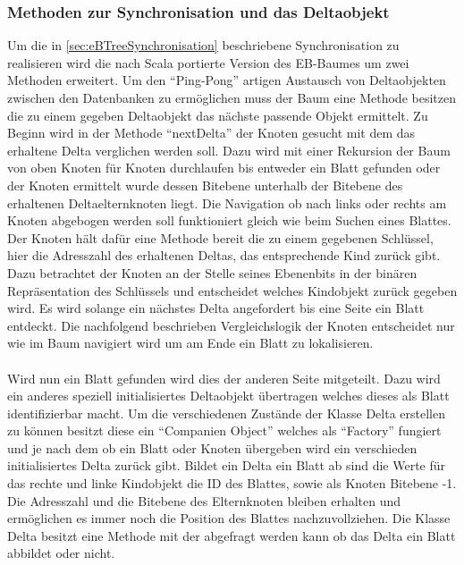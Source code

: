 \documentclass[a4paper,11pt,oneside,%
headsepline,												%
footsepline,												%
bibtotocnumbered									%
]{scrreprt}
\begin{document}
\subsubsection{Methoden zur Synchronisation und das Deltaobjekt}
Um die in \autoref{sec:eBTreeSynchronisation} beschriebene Synchronisation zu realisieren wird die nach Scala portierte Version des \ac{EB-Baum}es um zwei Methoden erweitert. Um den \enquote{Ping-Pong} artigen Austausch von Deltaobjekten zwischen den Datenbanken zu ermöglichen muss der Baum eine Methode besitzen die zu einem gegeben Deltaobjekt das nächste passende Objekt ermittelt. Zu Beginn wird in der Methode \enquote{nextDelta} der Knoten gesucht mit dem das erhaltene Delta verglichen werden soll. Dazu wird mit einer Rekursion der Baum von oben Knoten für Knoten durchlaufen bis entweder ein Blatt gefunden oder der Knoten ermittelt wurde dessen Bitebene unterhalb der Bitebene des erhaltenen Deltaelternknoten liegt. Die Navigation ob nach links oder rechts am Knoten abgebogen werden soll funktioniert gleich wie beim Suchen eines Blattes. Der Knoten hält dafür eine Methode bereit die zu einem gegebenen Schlüssel, hier die Adresszahl des erhaltenen Deltas, das entsprechende Kind zurück gibt. Dazu betrachtet der Knoten an der Stelle seines Ebenenbits in der binären Repräsentation des Schlüssels und entscheidet welches Kindobjekt zurück gegeben wird. Es wird solange ein nächstes Delta angefordert bis eine Seite ein Blatt entdeckt. Die nachfolgend beschrieben Vergleichslogik der Knoten entscheidet nur wie im Baum navigiert wird um am Ende ein Blatt zu lokalisieren.\\\\Wird nun ein Blatt gefunden wird dies der anderen Seite mitgeteilt. Dazu wird ein anderes speziell initialisiertes Deltaobjekt übertragen welches dieses als Blatt identifizierbar macht. Um die verschiedenen Zustände der Klasse Delta erstellen zu können besitzt diese ein \enquote{Companien Object} welches als \enquote{Factory} fungiert und je nach dem ob ein Blatt oder Knoten übergeben wird ein verschieden initialisiertes Delta zurück gibt. Bildet ein Delta ein Blatt ab sind die Werte für das rechte und linke Kindobjekt die \ac{ID} des Blattes, sowie als Knoten Bitebene -1. Die Adresszahl und die Bitebene des Elternknoten bleiben erhalten und ermöglichen es immer noch die Position des Blattes nachzuvollziehen. Die Klasse Delta besitzt eine Methode mit der abgefragt werden kann ob das Delta ein Blatt abbildet oder nicht.\\\\
\end{document}
